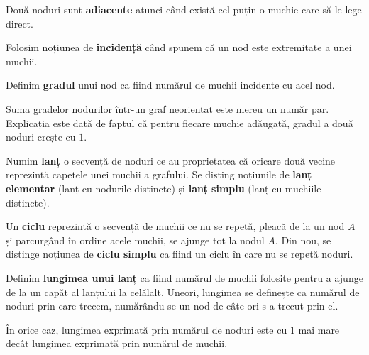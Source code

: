 \begin{definition}
    Două noduri sunt \textbf{adiacente} atunci când există cel puțin o muchie care să le lege direct.
\end{definition}

\begin{definition}
    Folosim noțiunea de \textbf{incidență} când spunem că un nod este extremitate a unei muchii. 
\end{definition}

\begin{definition}
    Definim \textbf{gradul} unui nod ca fiind numărul de muchii incidente cu acel nod. 
\end{definition}

\begin{observation}
    Suma gradelor nodurilor într-un graf neorientat este mereu un număr par. Explicația este dată de faptul că pentru fiecare muchie adăugată, gradul a două noduri crește cu $1$.
\end{observation}

\begin{definition}
    Numim \textbf{lanț} o secvență de noduri ce au proprietatea că oricare două vecine reprezintă capetele unei
muchii a grafului. Se disting noțiunile de \textbf{lanț elementar} (lanț cu nodurile distincte) și \textbf{lanț simplu} (lanț cu muchiile distincte).
\end{definition}

\begin{definition}
    Un \textbf{ciclu} reprezintă o secvență de muchii ce nu se repetă, pleacă de la un nod $A$ și parcurgând în ordine acele muchii, se ajunge tot la nodul $A$. Din nou, se distinge noțiunea de \textbf{ciclu simplu} ca fiind un ciclu în care nu se repetă noduri.
\end{definition}

\begin{definition}
    Definim \textbf{lungimea unui lanț} ca fiind numărul de muchii folosite pentru a ajunge de la un capăt al lanțului la celălalt. Uneori, lungimea se definește ca numărul de noduri prin care trecem, numărându-se un nod de câte ori s-a trecut prin el. 
\end{definition}

\begin{observation}
    În orice caz, lungimea exprimată prin numărul de noduri este cu $1$ mai mare decât lungimea exprimată prin numărul de muchii.
\end{observation}

